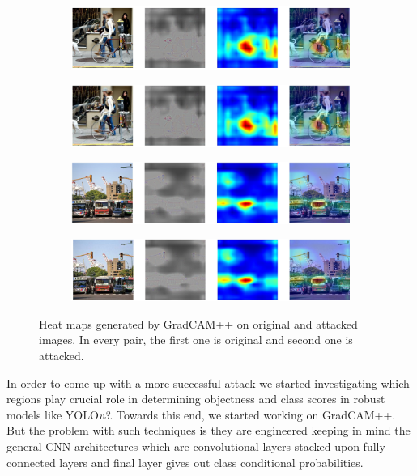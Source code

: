 \documentclass[letterpaper]{article}
\begin{document}
\begin{figure}[h]
\begin{subfigure}{\textwidth}
    \end{subfigure}
    \begin{subfigure}{\textwidth}
        \includegraphics[width = \textwidth, height = 0.15\textwidth]{Images/HeatMapsPGD/out_test6.jpg}
     \end{subfigure}
    \begin{subfigure}{\textwidth}
        \includegraphics[width = \textwidth, height = 0.15\textwidth]{Images/HeatMapsPGD/out_att_test6.jpg}
    \end{subfigure}
    \begin{subfigure}{\textwidth}
        \includegraphics[width = \textwidth, height = 0.15\textwidth]{Images/HeatMapsPGD/out_test10.jpg}
     \end{subfigure}
    \begin{subfigure}{\textwidth}
        \includegraphics[width = \textwidth, height = 0.15\textwidth]{Images/HeatMapsPGD/out_att_test10.jpg}
    \end{subfigure}
    \caption{Heat maps generated by GradCAM++ on original and attacked images. In every pair, the first one is original and second one is attacked. }
    \label{fig:heat-PGD}
\end{figure}
In order to come up with a more successful attack we started investigating which regions play crucial role in determining objectness and class scores in robust models like YOLO\emph{v3}. Towards this end, we started working on GradCAM++. But the problem with such techniques is they are engineered keeping in mind the general CNN architectures which are convolutional layers stacked upon fully connected layers and final layer gives out class conditional probabilities.\\
\end{document}
